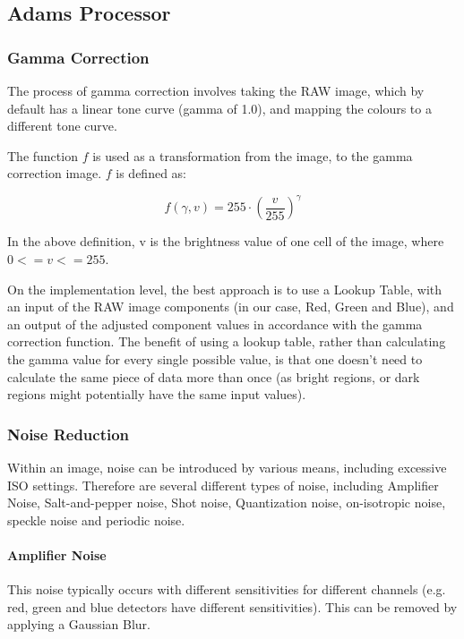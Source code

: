 \documentclass[10pt,a4paper]{article}
\begin{document}
\subsection{Adams Processor}\label{AdamsProcessor}
\subsubsection{Gamma Correction}
The process of gamma correction involves taking the RAW image, which by default has a linear tone curve (gamma of 1.0), and
mapping the colours to a different tone curve.

The function $f$ is used as a transformation from the image, to the gamma correction image. $f$ is defined as:

$$f(\gamma, v) = 255 \cdot (\frac{v}{255})^{\gamma}$$

In the above definition, v is the brightness value of one cell of the image, where $0 <= v <= 255$.

On the implementation level, the best approach is to use a Lookup Table, with an input of the RAW image components (in our case, Red, Green and Blue),
and an output of the adjusted component values in accordance with the gamma correction function. The benefit of using a lookup table, rather than calculating
the gamma value for every single possible value, is that one doesn't need to calculate the same piece of data more than once (as bright regions, or dark regions might
potentially have the same input values). 

\subsubsection{Noise Reduction}
Within an image, noise can be introduced by various means, including excessive ISO settings. Therefore are several different
types of noise, including Amplifier Noise, Salt-and-pepper noise, Shot noise, Quantization noise, on-isotropic noise, speckle noise
and periodic noise. 
\cite{NRandFiltering}





\paragraph{Amplifier Noise}
    This noise typically occurs with different sensitivities for different channels (e.g. red, green and blue detectors have
    different sensitivities). \cite{NRandFiltering}
    This can be removed by applying a Gaussian Blur. \cite{DigitalImageProcessingTextbook}
\end{document}
